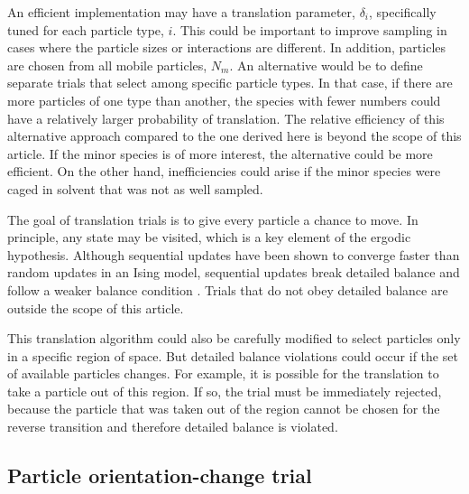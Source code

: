 \documentclass[
  9pt,
  bestpractices,
  pubversion,
]{livecoms}
\begin{document}
An efficient implementation may have a translation parameter, $\delta_i$, specifically tuned for each particle type, $i$.
This could be important to improve sampling in cases where the particle sizes or interactions are different.
In addition, particles are chosen from all mobile particles, $N_m$.
An alternative would be to define separate trials that select among specific particle types.
In that case, if there are more particles of one type than another, the species with fewer numbers could have a relatively larger probability of translation.
The relative efficiency of this alternative approach compared to the one derived here is beyond the scope of this article.
If the minor species is of more interest, the alternative could be more efficient.
On the other hand, inefficiencies could arise if the minor species were caged in solvent that was not as well sampled.

The goal of translation trials is to give every particle a chance to move.
In principle, any state may be visited, which is a key element of the ergodic hypothesis.
Although sequential updates have been shown to converge faster than random updates in an Ising model, sequential updates break detailed balance and follow a weaker balance condition \cite{ren_acceleration_2006}.
Trials that do not obey detailed balance are outside the scope of this article.

This translation algorithm could also be carefully modified to select particles only in a specific region of space.
But detailed balance violations could occur if the set of available particles changes.
For example, it is possible for the translation to take a particle out of this region.
If so, the trial must be immediately rejected, because the particle that was taken out of the region cannot be chosen for the reverse transition and therefore detailed balance is violated.

\subsection{\label{sec:lhs_rotation}Particle orientation-change trial}
\end{document}
